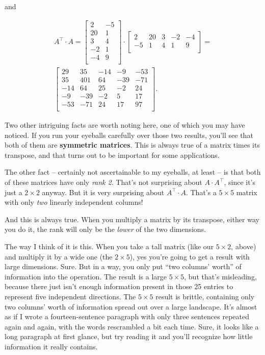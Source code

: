 and 

\vspace{-.15in}
\begin{align*}
A^\intercal \cdot A = 
\begin{bmatrix}
2 & -5 \\
20 & 1 \\
3 & 4 \\
-2 & 1 \\
-4 & 9 \\
\end{bmatrix} \cdot
\begin{bmatrix}
2 & 20 & 3 & -2 & -4 \\
-5 & 1 & 4 & 1 & 9 \\
\end{bmatrix} = \\
\begin{bmatrix}
29 & 35 & -14 & -9 & -53 \\
35 & 401 & 64 & -39 & -71 \\
-14 & 64 & 25 & -2 & 24 \\
-9 & -39 & -2 & 5 & 17 \\
-53 & -71 & 24 & 17 & 97 \\
\end{bmatrix}.
\end{align*}
\vspace{-.15in}


Two other intriguing facts are worth noting here, one of which you may have
noticed. If you run your eyeballs carefully over those two results, you'll see
that both of them are \textbf{symmetric matrices}. This is always true of a
matrix times its transpose, and that turns out to be important for some
applications.

The other fact -- certainly not ascertainable to my eyeballs, at least -- is
that both of these matrices have only \textit{rank 2}. That's not surprising
about $A\cdot A^\intercal$, since it's just a $2\times 2$ anyway. But it is
very surprising about $A^\intercal \cdot A$. That's a $5\times 5$ matrix with
only \textit{two} linearly independent columns!

And this is always true. When you multiply a matrix by its transpose, either
way you do it, the rank will only be the \textit{lower} of the two dimensions.

The way I think of it is this. When you take a tall matrix (like our $5\times
2$, above) and multiply it by a wide one (the $2\times 5$), yes you're going to
get a result with large dimensions. Sure. But in a way, you only put ``two
columns' worth'' of information into the operation. The result is a large
$5\times 5$, but that's misleading, because there just isn't enough information
present in those 25 entries to represent five independent directions. The
$5\times 5$ result is brittle, containing only two columns' worth of
information spread out over a large landscape. It's almost as if I wrote a
fourteen-sentence paragraph with only three sentences repeated again and again,
with the words rescrambled a bit each time. Sure, it looks like a long
paragraph at first glance, but try reading it and you'll recognize how little
information it really contains.

